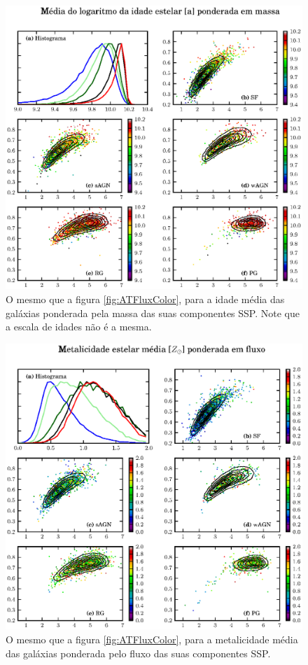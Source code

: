 \begin{figure}
	\includegraphics{figuras/uvcolor-color-at_mass-byclass.eps}
	\caption[Idade média das galáxias ponderada em massa no diagrama cor--cor UV.]
	{O mesmo que a figura \ref{fig:ATFluxColor}, para a idade média das galáxias
	ponderada pela massa das suas componentes SSP. Note que a escala de idades não
	é a mesma.}
	\label{fig:ATMassColor}
\end{figure}

\begin{figure}
	\includegraphics{figuras/uvcolor-color-am_flux-byclass.eps}
	\caption[Metalicidade das galáxias ponderada em fluxo no diagrama cor--cor UV.]
	{O mesmo que a figura \ref{fig:ATFluxColor}, para a metalicidade média das
	galáxias ponderada pelo fluxo das suas componentes SSP.}
	\label{fig:AMFluxColor}
\end{figure}


